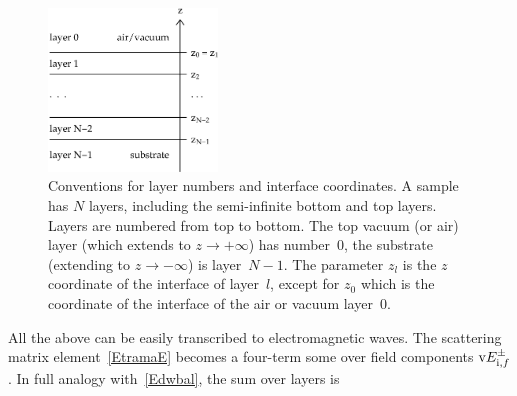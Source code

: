 \begin{figure}[tb]
\begin{center}
\includegraphics[width=0.4\textwidth]{fig/drawing/multilayer_z_conventions.ps}
\end{center}
\caption{Conventions for layer numbers and interface coordinates.
A sample has $N$ layers,
including the semi-infinite bottom and top layers.
Layers are numbered from top to bottom.
The top vacuum (or air) layer (which extends to $z\to+\infty$) has number~0,
the substrate (extending to $z\to-\infty$) is layer~$N-1$.
%
%
%
The parameter $z_l$
%
is the $z$ coordinate of the  interface of layer~$l$,
%
%
%
except for $z_0$ which is the coordinate of the  interface
of the air or vacuum layer~0.}
\label{Fdefz}
\end{figure}

All the above can be easily transcribed to electromagnetic waves.
The scattering matrix element~\cref{EtramaE}
becomes a four-term some over field components $\text{v}{E}^{\pm}_{\text i,f}$.
In full analogy with~\cref{Edwbal},
the sum over layers is

